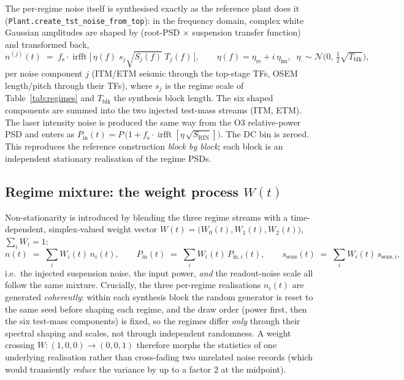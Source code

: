 \documentclass[11pt,a4paper]{article}
\newcommand{\code}[1]{\texttt{#1}}
\newcommand{\fs}{f_{\mathrm{s}}}
\begin{document}
The per-regime noise itself is synthesised exactly as the reference plant does it
(\code{Plant.create\_tst\_noise\_from\_top}): in the frequency domain, complex white
Gaussian amplitudes are shaped by (root-PSD $\times$ suspension transfer function) and
transformed back,
\begin{equation}
  \label{eq:synth}
  n^{(j)}(t) \;=\; \fs \cdot \operatorname{irfft}\!\Big[\, \eta(f)\;
  s_j \sqrt{S_j(f)}\; T_j(f) \,\Big],
  \qquad
  \eta(f) = \eta_{\mathrm{re}} + i\,\eta_{\mathrm{im}},\;\;
  \eta_{\cdot} \sim \mathcal N\!\big(0,\, \tfrac12\sqrt{T_{\mathrm{blk}}}\big),
\end{equation}
per noise component $j$ (ITM/ETM seismic through the top-stage TFs, OSEM length/pitch
through their TFs), where $s_j$ is the regime scale of Table~\ref{tab:regimes} and
$T_{\mathrm{blk}}$ the synthesis block length. The six shaped components are summed into
the two injected test-mass streams (ITM, ETM). The laser intensity noise is produced the
same way from the O3 relative-power PSD and enters as
$P_{\mathrm{in}}(t) = P\,\big(1 + \fs\!\cdot\!\operatorname{irfft}[\eta\,\sqrt{S_{\mathrm{RIN}}}]\big)$.
The DC bin is zeroed. This reproduces the reference construction \emph{block by block};
each block is an independent stationary realisation of the regime PSDs.

\subsection{Regime mixture: the weight process $W(t)$}
\label{sec:weights}

Non-stationarity is introduced by blending the three regime streams with a
time-dependent, simplex-valued weight vector
$W(t) = \big(W_0(t), W_1(t), W_2(t)\big)$, $\sum_i W_i = 1$:
\begin{equation}
  \label{eq:blend}
  n(t) \;=\; \textstyle\sum_{i} W_i(t)\, n_i(t),
  \qquad
  P_{\mathrm{in}}(t) \;=\; \textstyle\sum_{i} W_i(t)\, P_{\mathrm{in},i}(t),
  \qquad
  s_{\mathrm{sens}}(t) \;=\; \textstyle\sum_{i} W_i(t)\, s_{\mathrm{sens},i},
\end{equation}
i.e.\ the injected suspension noise, the input power, \emph{and} the readout-noise scale
all follow the same mixture. Crucially, the three per-regime realisations $n_i(t)$ are
generated \emph{coherently}: within each synthesis block the random generator is reset to
the same seed before shaping each regime, and the draw order (power first, then the six
test-mass components) is fixed, so the regimes differ \emph{only} through their spectral
shaping and scales, not through independent randomness. A weight crossing
$W: (1,0,0)\to(0,0,1)$ therefore morphs the statistics of one underlying realisation
rather than cross-fading two unrelated noise records (which would transiently
\emph{reduce} the variance by up to a factor 2 at the midpoint).
\end{document}
